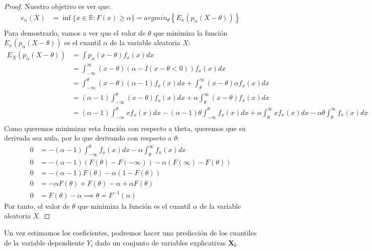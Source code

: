 \documentclass[11pt]{book}
\theoremstyle{plain} %
\theoremstyle{definition} %
\begin{document}
\begin{proof}
   Nuestro objetivo es ver que:
   \begin{align*}
      c_{\alpha}(X) &= \inf\{x\in \mathbb{R}:F(x)\geq \alpha\} = argmin_{\theta}\left\{E_x(p_{\alpha}(X-\theta))\right\}\\
   \end{align*}
   Para demostrarlo, vamos a ver que el valor de $\theta$ que minimiza la 
   función $E_x(p_{\alpha}(X-\theta))$ es el cuantil $\alpha$ de la variable 
   aleatoria $X$:
   \begin{align*}
       E_X(p_{\alpha}(X-\theta)) &= \int p_{\alpha}(x-\theta)f_x(x)dx\\
       &= \int _{-\infty}^{\infty}(x-\theta)(\alpha - I(x-\theta<0))f_x(x)dx\\
       &= \int_{-\infty}^{\theta}(x-\theta)(\alpha -1)f_x(x)dx+\int_{\theta}^{\infty}(x-\theta)\alpha f_x(x)dx\\
       &= (\alpha -1)\int_{-\infty}^{\theta}(x-\theta)f_x(x)dx+\alpha \int_{\theta}^{\infty}(x-\theta) f_x(x)dx\\
       &= (\alpha -1)\int_{-\infty}^{\theta}xf_x(x)dx-(\alpha -1)\theta \int_{-\infty}^{\theta}f_x(x)dx+\alpha \int_{\theta}^{\infty}x f_x(x)dx-\alpha \theta \int_{\theta}^{\infty} f_x(x)dx\\
   \end{align*}
   Como queremos minimizar esta función con respecto a theta, queremos 
   que su derivada sea nula, por lo que derivando con respecto a $\theta$:
   \begin{align*}
       0 &= -(\alpha -1) \int_{-\infty}^{\theta}f_x(x)dx-\alpha  \int_{\theta}^{\infty} f_x(x)dx\\
       0 &= -(\alpha -1) (F(\theta)-F(-\infty))- \alpha (F(\infty)-F(\theta))\\
       0 &= -(\alpha -1) F(\theta)-\alpha (1-F(\theta))\\
       0 &= -\alpha F(\theta)+F(\theta) -\alpha+\alpha F(\theta) \\
       0 &= F(\theta)-\alpha \implies \theta = F^{-1}(\alpha )
   \end{align*}
   Por tanto, el valor de $\theta$ que minimiza la función es el cuantil $\alpha$ de la variable aleatoria $X$.
\end{proof}
Un vez estimamos los coeficientes, podremos hacer una predicción de los 
cuantiles de la variable dependiente $Y_i$ dado un conjunto de variables 
explicativas $\mathbf{X_i}$.\\
\end{document}
